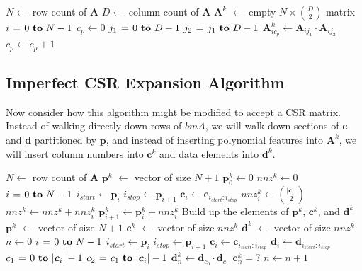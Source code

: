 \documentclass{article} %
\begin{document}
\begin{codebox}
\footnotesize
{}
    \li $N \gets$ row count of $\bm{A}$
    \li $D \gets$ column count of $\bm{A}$
    \li $\bm{A}^k$ $\gets$ empty $N \times \binom{D}{2}$ matrix
    \li \For $i \gets 0 \To N-1$ \Do
    \li     $c_p \gets 0$
    \li     \For $j_1 \gets 0 \To D-1$ \Do
    \li         \For $j_2 \gets j_1 \To D-1$ \Do
    \li             $\bm{A}^k_{i{c_p}} \gets \bm{A}_{ij_1} \cdot \bm{A}_{ij_2}$
    \li             $c_p \gets c_p + 1$
                \End
            \End
       	\End
\end{codebox}

\subsection{Imperfect CSR Expansion Algorithm}
\label{sec:final-algo}
Now consider how this algorithm might be modified to accept a CSR matrix.
Instead of walking directly down rows of $bm{A}$, we will walk down sections of $\bm{c}$ and $\bm{d}$ partitioned by $\bm{p}$, and instead of inserting polynomial features into $\bm{A}^k$, we will insert column numbers into $\bm{c}^k$ and data elements into $\bm{d}^k$.

\begin{codebox}
\footnotesize
{}
    \li $N \gets$ row count of $\bm{A}$
    \li $\bm{p}^k$ $\gets$ vector of size $N+1$
    \li $\bm{p}^k_0 \gets 0$
    \li $nnz^k \gets 0$
    \li \For $i \gets 0 \To N-1$ \Do
    \li     $i_{start} \gets \bm{p}_i$
    \li     $i_{stop} \gets \bm{p}_{i+1}$
    \li     $\bm{c}_i \gets \bm{c}_{i_{start}:i_{stop}}$
    \li     $nnz^k_i \gets \binom{|\bm{c}_i|}{2}$
    \li     $nnz^k \gets nnz^k + nnz^k_i$
    \li     $\bm{p}^k_{i+1} \gets \bm{p}^k_i + nnz^k_i$
        \End
    \zi     
    \zi \Comment Build up the elements of $\bm{p}^k$, $\bm{c}^k$, and $\bm{d}^k$
    \li $\bm{p}^k$ $\gets$ vector of size $N+1$
    \li $\bm{c}^k$ $\gets$ vector of size $nnz^k$
    \li $\bm{d}^k$ $\gets$ vector of size $nnz^k$
    \li $n \gets 0$
    \li \For $i \gets 0 \To N-1$ \Do
    \li     $i_{start} \gets \bm{p}_i$
    \li     $i_{stop} \gets \bm{p}_{i+1}$
    \li     $\bm{c}_i \gets \bm{c}_{i_{start}:i_{stop}}$
    \li     $\bm{d}_i \gets \bm{d}_{i_{start}:i_{stop}}$
    \li     \For $c_1 \gets 0 \To |\bm{c}_i|-1$ \Do
    \li         \For $c_2 \gets c_1 \To |\bm{c}_i|-1$ \Do
    \li             $\bm{d}^k_{n} \gets \bm{d}_{c_0} \cdot \bm{d}_{c_1}$
    \li             $\bm{c}^k_{n} = ?$ \label{li:set_ck}
    \li             $n \gets n + 1$
                \End
            \End
       	\End
\end{codebox}
\end{document}
